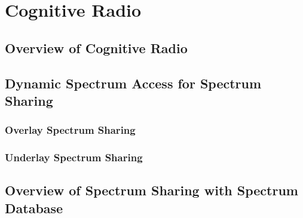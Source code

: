 \chapter[Cognitive Radio]{Cognitive Radio}
\label{chapter:CR}

\section{Overview of Cognitive Radio}

\section{Dynamic Spectrum Access for Spectrum Sharing}
    \subsection{Overlay Spectrum Sharing}
    \subsection{Underlay Spectrum Sharing}

\section{Overview of Spectrum Sharing with Spectrum Database}
